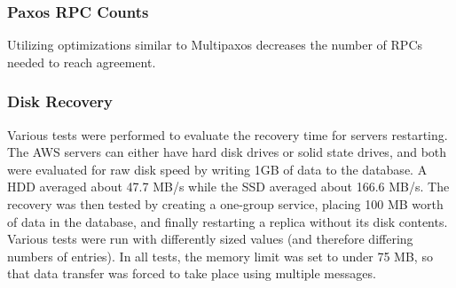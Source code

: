 \documentclass[letterpaper,10pt]{article}
\begin{document}
\begin{itemize}
\subsubsection{Paxos RPC Counts}

Utilizing optimizations similar to Multipaxos decreases the number of RPCs needed to reach agreement.

\begin{table}[h]
\centering
{}
\end{table}

\subsubsection{Disk Recovery}
Various tests were performed to evaluate the recovery time for servers restarting.  The AWS servers can either have hard disk drives or solid state drives, and both were evaluated for raw disk speed by writing 1GB of data to the database.  A HDD averaged about 47.7 MB/s while the SSD averaged about 166.6 MB/s.  The recovery was then tested by creating a one-group service, placing 100 MB worth of data in the database, and finally restarting a replica without its disk contents.  Various tests were run with differently sized values (and therefore differing numbers of entries).  In all tests, the memory limit was set to under 75 MB, so that data transfer was forced to take place using multiple messages.


\end{itemize}
\end{document}
